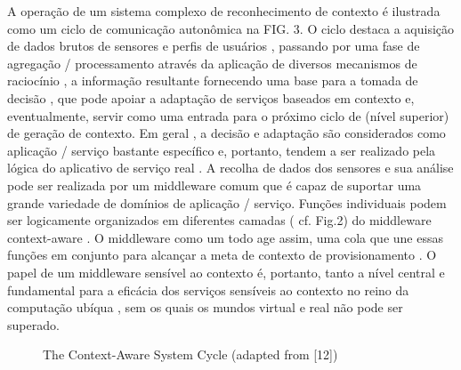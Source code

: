 \documentclass[12pt]{article} %
\begin{document}
A operação de um sistema complexo de reconhecimento de contexto é ilustrada como um ciclo de comunicação autonômica na FIG. 3. O ciclo destaca a aquisição de dados brutos de sensores e perfis de usuários , passando por uma fase de agregação / processamento através da aplicação de diversos mecanismos de raciocínio , a informação resultante fornecendo uma base para a tomada de decisão , que pode apoiar a adaptação de serviços baseados em contexto e, eventualmente, servir como uma entrada para o próximo ciclo de (nível superior) de geração de contexto. Em geral , a decisão e adaptação são considerados como aplicação / serviço bastante específico e, portanto, tendem a ser realizado pela lógica do aplicativo de serviço real . A recolha de dados dos sensores e sua análise pode ser realizada por um middleware comum que é capaz de suportar uma grande variedade de domínios de aplicação / serviço. Funções individuais podem ser logicamente organizados em diferentes camadas ( cf. Fig.2) do middleware context-aware . O middleware como um todo age assim, uma cola que une essas funções em conjunto para alcançar a meta de contexto de provisionamento . O papel de um middleware sensível ao contexto é, portanto, tanto a nível central e fundamental para a eficácia dos serviços sensíveis ao contexto no reino da computação ubíqua , sem os quais os mundos virtual e real não pode ser superado.

\begin{figure}[H]
\caption{The Context-Aware System Cycle (adapted from [12])}
\label{fig:speciation}
\end{figure}

\end{document}
